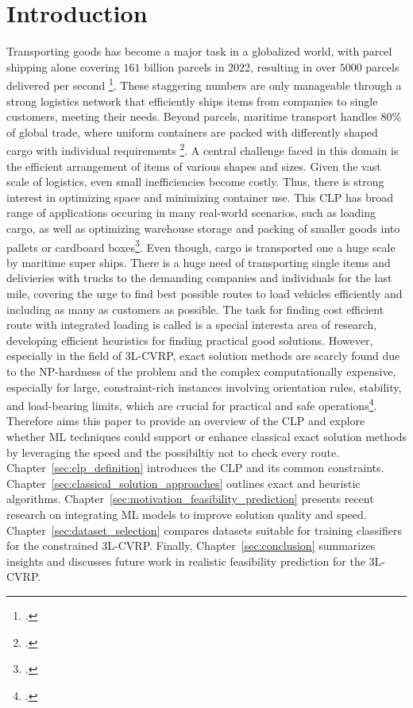 \chapter{Introduction}
\label{sec:introduction}
Transporting goods has become a major task in a globalized world, with parcel shipping alone covering
$161$ billion parcels in 2022, resulting in over $5000$ parcels delivered per second \footcite[cf.][]{noauthor_parcel_nodate}.
These staggering numbers are only manageable through a strong logistics network that efficiently ships
items from companies to single customers, meeting their needs. Beyond parcels, maritime transport
handles $80\%$ of global trade, where uniform containers are packed with differently shaped cargo with
individual requirements \footcite[cf.][]{united_nations_trade_and_development_review_2024}.
A central challenge faced in this domain is the
efficient arrangement of items of various shapes and sizes. Given the vast scale of logistics, even small inefficiencies become costly. Thus, there is strong
interest in optimizing space and minimizing container use.
This \gls{CLP} has  broad range of applications occuring in many real-world scenarios,
such as loading cargo, as well as optimizing warehouse storage and
packing of smaller goods into pallets or cardboard boxes\footcite[cf.][p.1]{bortfeldt_constraints_2013}.
Even though, cargo is transported one a huge scale by maritime super ships. There is a huge need of transporting
single items and delivieries with trucks to the demanding companies and individuals for the last mile,
covering the urge to find best possible routes to load vehicles efficiently and including as many as customers
as possible. The task for finding cost efficient route with integrated loading is called is a special interesta
area of research, developing efficient heuristics for finding practical good solutions. However, especially
in the field of \gls{3L-CVRP}, exact solution methods are scarcly found due to the NP-hardness of the problem
and the complex  computationally expensive, especially for large, constraint-rich instances
involving orientation rules, stability, and load-bearing limits, which are crucial for practical and safe
operations\footcite[cf.][p.377--378]{bischoff_issues_1995}. Therefore aims this paper to provide an overview
of the \gls{CLP} and explore whether \gls{ML} techniques could support or enhance classical exact solution methods
by leveraging the speed and the possibiltiy not to check every route.
Chapter~\ref{sec:clp_definition} introduces the \gls{CLP} and its common constraints.
Chapter~\ref{sec:classical_solution_approaches} outlines exact and heuristic algorithms.
Chapter~\ref{sec:motivation_feasibility_prediction} presents recent research on integrating \gls{ML}
models to improve solution quality and speed. Chapter~\ref{sec:dataset_selection} compares datasets
suitable for training classifiers for the constrained \gls{3L-CVRP}. Finally, Chapter~\ref{sec:conclusion}
summarizes insights and discusses future work in realistic feasibility prediction for the \gls{3L-CVRP}.


